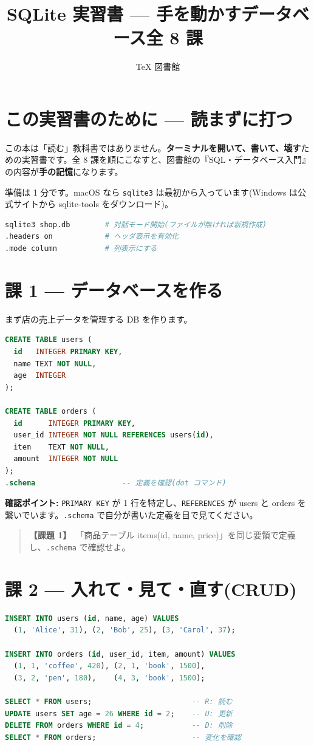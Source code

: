 \documentclass{article}
\title{SQLite 実習書 — 手を動かすデータベース全 8 課}
\author{TeX 図書館}
\begin{document}
\section{この実習書のために — 読まずに打つ}

この本は「読む」教科書ではありません。\textbf{ターミナルを開いて、書いて、壊す}ための実習書です。全 8 課を順にこなすと、図書館の『SQL・データベース入門』の内容が\textbf{手の記憶}になります。

準備は 1 分です。macOS なら \texttt{sqlite3} は最初から入っています(Windows は公式サイトから sqlite-tools をダウンロード)。

\begin{lstlisting}[language=bash]
sqlite3 shop.db        # 対話モード開始(ファイルが無ければ新規作成)
.headers on            # ヘッダ表示を有効化
.mode column           # 列表示にする
\end{lstlisting}

\section{課 1 — データベースを作る}

まず店の売上データを管理する DB を作ります。

\begin{lstlisting}[language=SQL]
CREATE TABLE users (
  id   INTEGER PRIMARY KEY,
  name TEXT NOT NULL,
  age  INTEGER
);

CREATE TABLE orders (
  id      INTEGER PRIMARY KEY,
  user_id INTEGER NOT NULL REFERENCES users(id),
  item    TEXT NOT NULL,
  amount  INTEGER NOT NULL
);
.schema                    -- 定義を確認(dot コマンド)
\end{lstlisting}

\textbf{確認ポイント:} \texttt{PRIMARY KEY} が 1 行を特定し、\texttt{REFERENCES} が users と orders を繋いでいます。\texttt{.schema} で自分が書いた定義を目で見てください。

\begin{quote}
\textbf{【課題 1】}\ 「商品テーブル items(id, name, price)」を同じ要領で定義し、\texttt{.schema} で確認せよ。
\end{quote}

\section{課 2 — 入れて・見て・直す(CRUD)}

\begin{lstlisting}[language=SQL]
INSERT INTO users (id, name, age) VALUES
  (1, 'Alice', 31), (2, 'Bob', 25), (3, 'Carol', 37);

INSERT INTO orders (id, user_id, item, amount) VALUES
  (1, 1, 'coffee', 420), (2, 1, 'book', 1500),
  (3, 2, 'pen', 180),    (4, 3, 'book', 1500);

SELECT * FROM users;                       -- R: 読む
UPDATE users SET age = 26 WHERE id = 2;    -- U: 更新
DELETE FROM orders WHERE id = 4;           -- D: 削除
SELECT * FROM orders;                      -- 変化を確認
\end{lstlisting}
\end{document}
